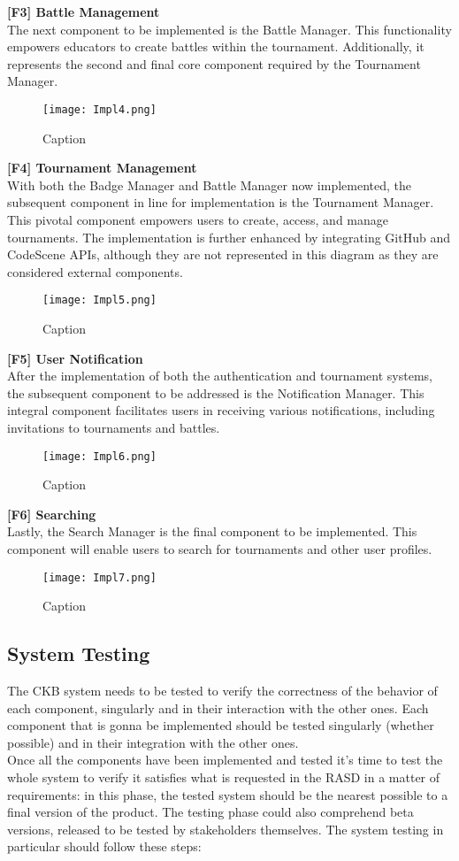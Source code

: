 \documentclass{article}
\begin{document}
\newpage
\noindent
\textbf{[F3] Battle Management} \\
The next component to be implemented is the Battle Manager. This functionality empowers educators to create battles within the tournament. Additionally, it represents the second and final core component required by the Tournament Manager.
\begin{figure}[H]
    \centering
    \texttt{[image: Impl4.png]}
    \caption{Caption}
\end{figure}

\newpage
\noindent
\textbf{[F4] Tournament Management} \\
With both the Badge Manager and Battle Manager now implemented, the subsequent component in line for implementation is the Tournament Manager. This pivotal component empowers users to create, access, and manage tournaments. The implementation is further enhanced by integrating GitHub and CodeScene APIs, although they are not represented in this diagram as they are considered external components.
\begin{figure}[H]
    \centering
    \texttt{[image: Impl5.png]}
    \caption{Caption}
\end{figure}

\newpage
\noindent
\textbf{[F5] User Notification} \\
After the implementation of both the authentication and tournament systems, the subsequent component to be addressed is the Notification Manager. This integral component facilitates users in receiving various notifications, including invitations to tournaments and battles.
\begin{figure}[H]
    \centering
    \texttt{[image: Impl6.png]}
    \caption{Caption}
\end{figure}

\newpage
\noindent
\textbf{[F6] Searching} \\
Lastly, the Search Manager is the final component to be implemented. This component will enable users to search for tournaments and other user profiles.
\begin{figure}[H]
    \centering
    \texttt{[image: Impl7.png]}
    \caption{Caption}
\end{figure}
\newpage
\subsection{System Testing}
The CKB system needs to be tested to verify the correctness of the behavior of each component, singularly and in their interaction with the other ones.
Each component that is gonna be implemented should be tested singularly (whether possible) and in their integration with the other ones.\\
Once all the components have been implemented and tested it's time to test the whole system to verify it satisfies what is requested in the RASD in a matter of requirements: in this phase, the tested system should be the nearest possible to a final version of the product.
The testing phase could also comprehend beta versions, released to be tested by stakeholders themselves.
The system testing in particular should follow these steps:
\end{document}

